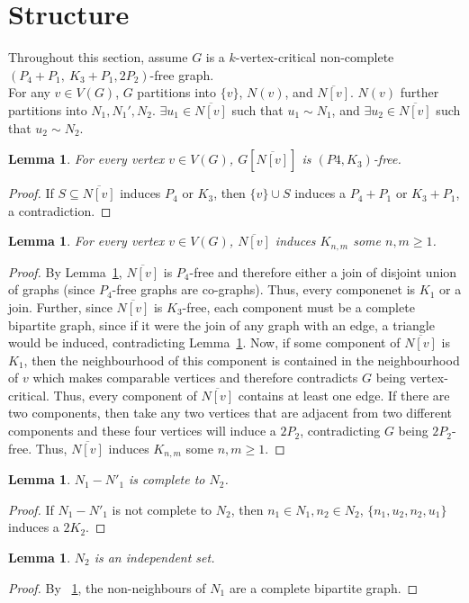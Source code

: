 \documentclass[11pt]{article}
\newtheorem{lemma}[theorem]{Lemma}
\theoremstyle{definition}
\newcommand{\forbid}{$(P_4+P_1,\ K_3+P_1,2P_2)$}
\newcommand{\noneighbs}{\overline{N[v]}}
\begin{document}
\section{Structure}

Throughout this section, assume $G$ is a $k$-vertex-critical non-complete \forbid -free graph.\\

For any $v\in V(G)$, $G$ partitions into $\{v\}$, $N(v)$, and $\overline{N[v]}$. $N(v)$ further partitions into $N_1, N_1', N_2$. $\exists u_1 \in \noneighbs$ such that $u_1 \sim N_1$, and $\exists u_2 \in \noneighbs$ such that $u_2 \sim N_2$.


\begin{lemma}\label{lem:P4K3-free}
For every vertex $v\in V(G)$,  $G[\noneighbs]$ is $(P4, K_3)$-free.
\end{lemma}
\begin{proof}
If $S\subseteq\noneighbs$ induces $P_4$ or $K_3$, then $\{v\}\cup S$ induces a $P_4+P_1$ or $K_3+P_1$, a contradiction.
\end{proof}



\begin{lemma}\label{lem:completebipartite}
For every vertex $v\in V(G)$,  $\noneighbs$ induces $K_{n,m}$ some $n,m\ge 1$.
\end{lemma}
\begin{proof}
By Lemma~\ref{lem:P4K3-free}, $\noneighbs$ is $P_4$-free and therefore either a join of disjoint union of graphs (since $P_4$-free graphs are co-graphs). Thus, every componenet is $K_1$ or a join. Further, since $\noneighbs$ is $K_3$-free, each component must be a complete bipartite graph, since if it were the join of any graph with an edge, a triangle would be induced, contradicting Lemma~\ref{lem:P4K3-free}. Now, if some component of $\noneighbs$ is $K_1$, then the neighbourhood of this component is contained in the neighbourhood of $v$ which makes comparable vertices and therefore contradicts $G$ being vertex-critical. Thus, every component of $\noneighbs$ contains at least one edge. If there are two components, then take any two vertices that are adjacent from two different components and these four vertices will induce a $2P_2$, contradicting $G$ being $2P_2$-free. Thus,  $\noneighbs$ induces $K_{n,m}$ some $n,m\ge 1$.
\end{proof}

\begin{lemma}\label{lem:neighbscomplete}
$N_1 - N'_1$ is complete to $N_2$.
\end{lemma}
\begin{proof}
If $N_1 - N'_1$ is not complete to $N_2$, then $n_1 \in N_1, n_2 \in N_2$, $\{ n_1, u_2, n_2, u_1 \}$ induces a $2K_2$.
\end{proof}
\begin{lemma}\label{lem:n2indep}
$N_2$ is an independent set.
\end{lemma}
\begin{proof}
By ~\ref{lem:completebipartite}, the non-neighbours of $N_1$ are a complete bipartite graph.
\end{proof}
\end{document}
